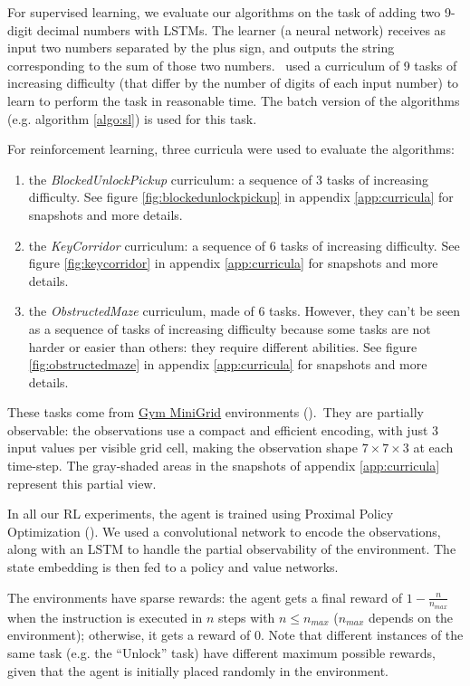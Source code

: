\documentclass{article}
\begin{document}
For supervised learning, we evaluate our algorithms on the task of adding two 9-digit decimal numbers with LSTMs. The learner (a neural network) receives as input two numbers separated by the plus sign, and outputs the string corresponding to the sum of those two numbers.~\citep{zaremba2014learning} used a curriculum of 9 tasks of increasing difficulty (that differ by the number of digits of each input number) to learn to perform the task in reasonable time. The batch version of the algorithms (e.g. algorithm \ref{algo:sl}) is used for this task.

For reinforcement learning, three curricula were used to evaluate the algorithms:
\begin{enumerate}
\item the \textit{BlockedUnlockPickup} curriculum: a sequence of 3 tasks of increasing difficulty. See figure \ref{fig:blockedunlockpickup} in appendix \ref{app:curricula} for snapshots and more details.
\item the \textit{KeyCorridor} curriculum: a sequence of 6 tasks of increasing difficulty. See figure \ref{fig:keycorridor} in appendix \ref{app:curricula} for snapshots and more details.
\item the \textit{ObstructedMaze} curriculum, made of 6 tasks. However, they can't be seen as a sequence of tasks of increasing difficulty because some tasks are not harder or easier than others: they require different abilities. See figure \ref{fig:obstructedmaze} in appendix \ref{app:curricula} for snapshots and more details.
\end{enumerate}

These tasks come from \href{https://github.com/maximecb/gym-minigrid}{Gym MiniGrid} environments (\citep{gym_minigrid}).\ They are partially observable: the observations use a compact and efficient encoding, with just 3 input values per visible grid cell, making the observation shape \(7\times7\times3\) at each time-step. The gray-shaded areas in the snapshots of appendix \ref{app:curricula} represent this partial view.

In all our RL experiments, the agent is trained using Proximal Policy Optimization (\citep{schulman2017proximal}). We used a convolutional network to encode the observations, along with an LSTM to handle the partial observability of the environment. The state embedding is then fed to a policy and value networks.

The environments have sparse rewards: the agent gets a final reward of \(1-\frac{n}{n_{max}}\) when the instruction is executed in \(n\) steps with \(n\leq n_{max}\) (\(n_{max}\) depends on the environment); otherwise, it gets a reward of \(0\). Note that different instances of the same task (e.g. the ``Unlock'' task) have different maximum possible rewards, given that the agent is initially placed randomly in the environment.
\end{document}
